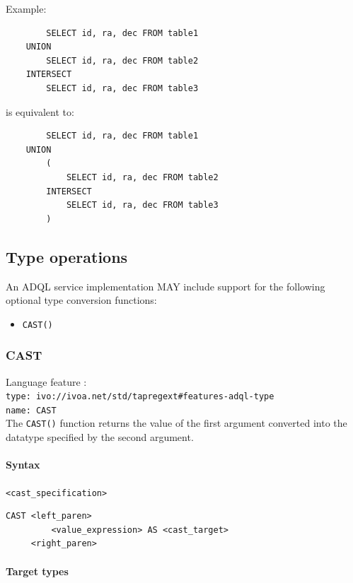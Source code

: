 \documentclass[11pt,a4paper]{ivoa}
\begin{document}
Example:

\begin{verbatim}
        SELECT id, ra, dec FROM table1
    UNION
        SELECT id, ra, dec FROM table2
    INTERSECT
        SELECT id, ra, dec FROM table3
\end{verbatim}

is equivalent to:

\begin{verbatim}
        SELECT id, ra, dec FROM table1
    UNION
        (
            SELECT id, ra, dec FROM table2
        INTERSECT
            SELECT id, ra, dec FROM table3
        )
\end{verbatim}

\subsection{Type operations}
\label{sec:type}

An ADQL service implementation MAY include support for the following optional
type conversion functions: 

\begin{itemize}
    \item \verb:CAST():
\end{itemize}

\subsubsection{CAST}
\label{sec:type.cast}
{\footnotesize Language feature :}\\
{\footnotesize \verb|type: ivo://ivoa.net/std/tapregext#features-adql-type|}\\
{\footnotesize \verb|name: CAST|}\\

The \verb:CAST(): function returns the value of the first argument converted
into the datatype specified by the second argument.

\paragraph{Syntax} \verb:<cast_specification>:
\begin{verbatim}
CAST <left_paren>
         <value_expression> AS <cast_target>
     <right_paren>
\end{verbatim}

\paragraph{Target types}
\end{document}
